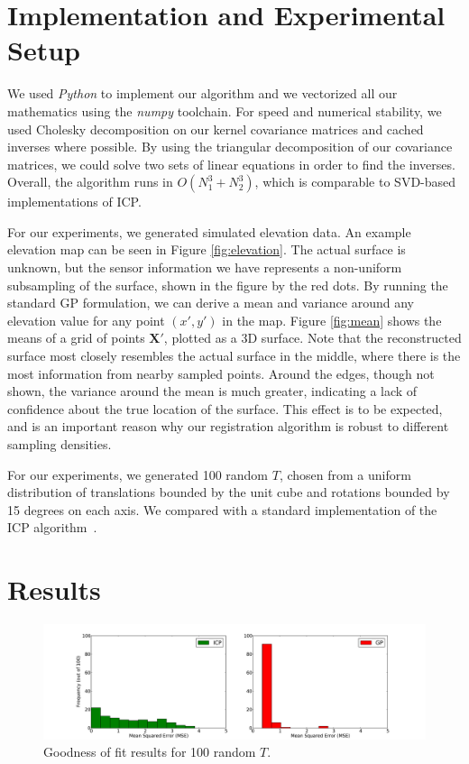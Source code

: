 \documentclass{article} %
\begin{document}
\section{Implementation and Experimental Setup}

We used \emph{Python} to implement our algorithm and we vectorized all our mathematics using the \emph{numpy} toolchain. For speed and numerical stability, we used Cholesky decomposition on our kernel covariance matrices and cached inverses where possible. By using the triangular decomposition of our covariance matrices, we could solve two sets of linear equations in order to find the inverses. Overall, the algorithm runs in $O(N_1^3 + N_2^3)$, which is comparable to SVD-based implementations of ICP.

For our experiments, we generated simulated elevation data. An example elevation map can be seen in Figure \ref{fig:elevation}. The actual surface is unknown, but the sensor information we have represents a non-uniform subsampling of the surface, shown in the figure by the red dots. By running the standard GP formulation, we can derive a mean and variance around any elevation value for any point $(x',y')$ in the map. Figure \ref{fig:mean} shows the means of a grid of points $\mathbf{X'}$, plotted as a 3D surface. Note that the reconstructed surface most closely resembles the actual surface in the middle, where there is the most information from nearby sampled points. Around the edges, though not shown, the variance around the mean is much greater, indicating a lack of confidence about the true location of the surface. This effect is to be expected, and is an important reason why our registration algorithm is robust to different sampling densities.

For our experiments, we generated 100 random $T$, chosen from a uniform distribution of translations bounded by the unit cube and rotations bounded by 15 degrees on each axis. We compared with a standard implementation of the ICP algorithm~\cite{besl_method_1992}. 


\section{Results}

\begin{figure}[ht!]
\begin{center}
\includegraphics[width=5.7in]{goodnessoffit3.pdf}
\end{center}
\caption{Goodness of fit results for 100 random $T$.}
\label{fig:mse}
\end{figure}
\end{document}
